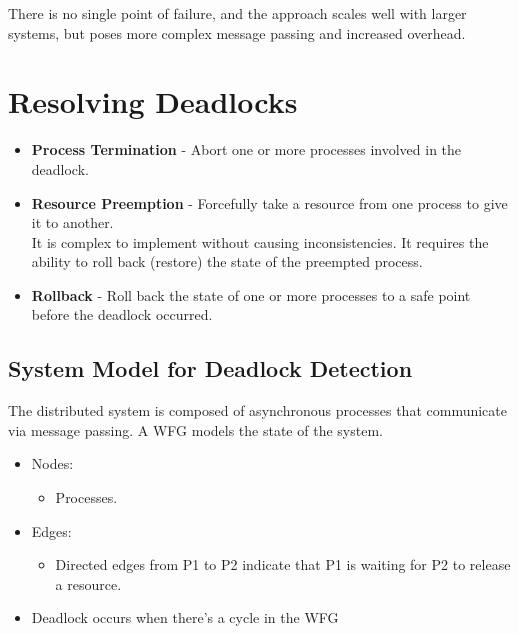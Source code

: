 There is no single point of failure, and the approach scales well with larger systems, but poses more complex message passing and increased overhead.

\section{Resolving Deadlocks}
\begin{itemize}
	\item \textbf{Process Termination} - Abort one or more processes involved in the deadlock.
	\item \textbf{Resource Preemption} - Forcefully take a resource from one process to give it to another.\\
	It is complex to implement without causing inconsistencies. It requires the ability to roll back (restore) the state of the preempted process.
	\item \textbf{Rollback} - Roll back the state of one or more processes to a safe point before the deadlock occurred.
\end{itemize}

\subsection{System Model for Deadlock Detection}
The distributed system is composed of asynchronous processes that communicate via message passing.
A WFG models the state of the system.

\begin{itemize}
	\item Nodes:
	\begin{itemize}
      \item 
      Processes.
   \end{itemize}
	\item Edges:
	\begin{itemize}
      \item 
      Directed edges from P1 to P2 indicate
      that P1 is waiting for P2 to release a
      resource.
   \end{itemize}
	\item Deadlock occurs when there’s a cycle in the WFG
\end{itemize}

